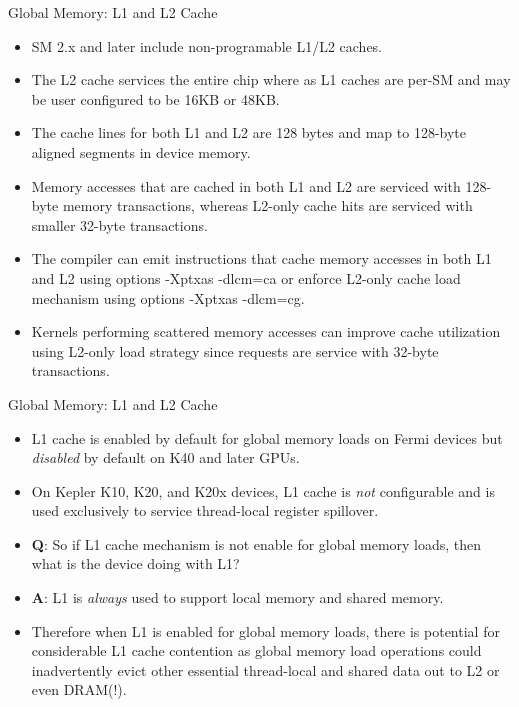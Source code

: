 \documentclass[handout]{beamer}
\begin{document}
\begin{frame}{Global Memory: L1 and L2 Cache}
\begin{itemize}
	\item<1->SM 2.x and later include non-programable L1/L2 caches.
	\item<1->The L2 cache services the entire chip where as L1 caches are per-SM and may be user configured to be 16KB or 48KB.
	\item<1->The cache lines for both L1 and L2 are 128 bytes and map to 128-byte aligned segments in device memory.
	\item<1->Memory accesses that are cached in both L1 and L2 are serviced with 128-byte memory transactions, whereas L2-only cache hits are serviced with smaller 32-byte transactions.
	\item<1->The compiler can emit instructions that cache memory accesses in both L1 and L2 using options {\selectfont -Xptxas -dlcm=ca} or enforce L2-only cache load mechanism using options {\selectfont -Xptxas -dlcm=cg}.
	\item<1-> Kernels performing scattered memory accesses can improve cache utilization using L2-only load strategy since requests are service with 32-byte transactions.
\end{itemize}
\end{frame}

\begin{frame}{Global Memory: L1 and L2 Cache}
\begin{itemize}
\itemsep1em
	\item<1->L1 cache is enabled by default for global memory loads on Fermi devices but \emph{disabled} by default on K40 and later GPUs.
	\item<1->On Kepler K10, K20, and K20x devices, L1 cache is \emph{not} configurable and is used exclusively to service thread-local register spillover.
	\item<1->\textbf{Q}: So if L1 cache mechanism is not enable for global memory loads, then what is the device doing with L1?
	\item<1->\textbf{A}: L1 is \emph{always} used to support local memory and shared memory.
	\item<1->Therefore when L1 is enabled for global memory loads, there is potential for considerable L1 cache contention as global memory load operations could inadvertently evict other essential thread-local and shared data out to L2 or even DRAM(!). 
\end{itemize}
\end{frame}
\end{document}
